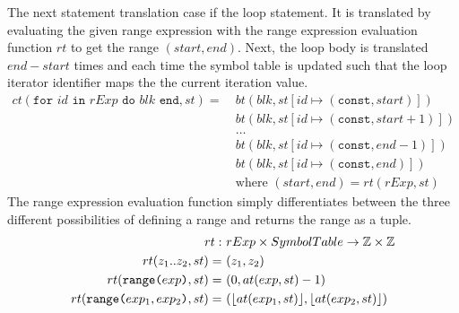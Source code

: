 The next statement translation case if the loop statement. It is translated by evaluating the given range expression with the range expression evaluation function $rt$ to get the range $(start, end)$. Next, the loop body is translated $end - start$ times and each time the symbol table is updated such that the loop iterator identifier maps the the current iteration value.
\begin{align*}
    ct(\texttt{for } id \texttt{ in } rExp \texttt{ do } blk \texttt{ end}, st) = \ 
        & bt(blk, st[id \mapsto (\texttt{const}, start)])\\
        & bt(blk, st[id \mapsto (\texttt{const}, start + 1)])\\
        & \dots\\
        & bt(blk, st[id \mapsto (\texttt{const}, end - 1)])\\
        & bt(blk, st[id \mapsto (\texttt{const}, end)])\\
        & \text{where } (start, end) = rt(rExp, st)
\end{align*}
The range expression evaluation function simply differentiates between the three different possibilities of defining a range and returns the range as a tuple. 
\begin{align*}
    rt : \ & rExp \times SymbolTable \to \mathbb{Z} \times \mathbb{Z}\\
    rt(z_1 .. z_2, st)  = \ & (z_1, z_2)\\
    rt(\texttt{range(} exp \texttt{)}, st) = \ & (0, at(exp, st) - 1)\\
    rt(\texttt{range(} exp_1, exp_2 \texttt{)}, st) = \ & (\lfloor at(exp_1, st)\rfloor, \lfloor at(exp_2, st)\rfloor)
\end{align*}

